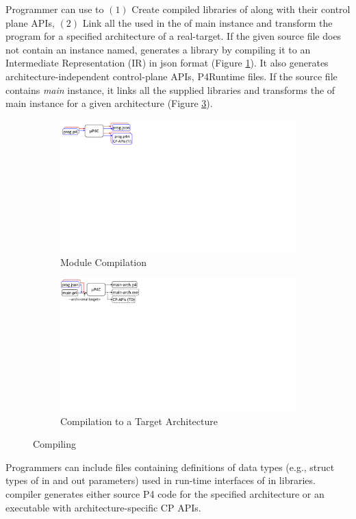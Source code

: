 \documentclass[letterpaper,twocolumn,10pt]{article}
\begin{document}
Programmer can use \ucomp to $(1)$ Create compiled libraries of \uprograms along with their control plane APIs, $(2)$ Link all the \uprograms used in the \uprogram of main instance and transform the program for a specified architecture of a real-target.
If the given source file does not contain an instance named, \ucomp generates a library by compiling it to an Intermediate Representation (IR) in json format (Figure \ref{subfig:module-compilation}).
It also generates architecture-independent control-plane APIs, P4Runtime \cite{p4runtime} files.
If the source file contains \emph{main} instance, it links all the supplied libraries and transforms the \uprogram of main instance for a given architecture (Figure \ref{subfig:compilation-to-target-architecture}).
\begin{figure}[h]
    \begin{subfigure}{\linewidth}
        \centering
        \includegraphics[trim=10 440 666 0, clip,scale=0.5]{mp4c-frontend.pdf}
         \caption{Module Compilation}
         \label{subfig:module-compilation}
    \end{subfigure}
    \begin{subfigure}{\linewidth}
        \centering
        \includegraphics[trim=3 440 640 0, clip,scale=0.5]{mp4c-compiler}
        \caption{Compilation to a Target Architecture}
        \label{subfig:compilation-to-target-architecture}
    \end{subfigure}
    \caption{Compiling \uprograms}
\end{figure}
Programmers can include files containing definitions of data types (e.g., struct types of in and out parameters) used in run-time interfaces of \uprogram in libraries.
\ucomp compiler generates either source P4 code for the specified architecture or an executable with architecture-specific CP APIs.
\end{document}
